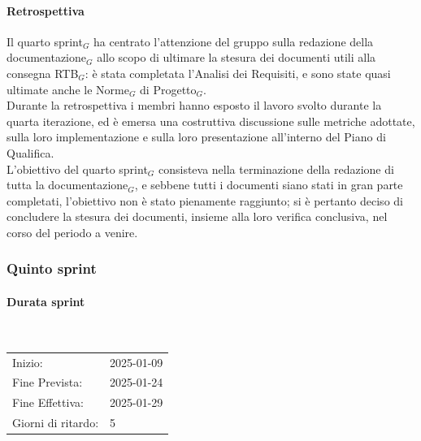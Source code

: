 \documentclass[10pt]{article}
\begin{document}
{{{{{    \paragraph{Retrospettiva}\mbox{}\vspace{0.4em}

    Il quarto sprint$_G$ ha centrato l'attenzione del gruppo sulla redazione della documentazione$_G$ allo scopo di ultimare la stesura dei 
    documenti utili alla consegna RTB$_G$: è stata completata l'Analisi dei Requisiti, e sono state quasi ultimate anche le Norme$_G$ di Progetto$_G$.\\
    Durante la retrospettiva i membri hanno esposto il lavoro svolto durante la quarta iterazione, ed è emersa una costruttiva discussione
    sulle metriche adottate, sulla loro implementazione e sulla loro presentazione all'interno del Piano di Qualifica.\\
    L'obiettivo del quarto sprint$_G$ consisteva nella terminazione della redazione di tutta la documentazione$_G$, e sebbene tutti i documenti siano
    stati in gran parte completati, l'obiettivo non è stato pienamente raggiunto; si è pertanto deciso di concludere la stesura dei documenti,
    insieme alla loro verifica conclusiva, nel corso del periodo a venire.



\newpage
\subsubsection{Quinto sprint}
\label{quinto-sprint$_G$}
    
    \paragraph{Durata sprint}\mbox{}\\
    \vspace{-1.5em}
    \begin{table}[h] 
    \renewcommand{\arraystretch}{1.2}  
    \begin{tabular}{ l l }
        Inizio: & 2025-01-09 \\
        Fine Prevista: & 2025-01-24 \\
        Fine Effettiva: & 2025-01-29 \\
        Giorni di ritardo: & 5 \\
    \end{tabular}
    \end{table}
    \vspace{-2em}
    {\renewcommand{\arraystretch}{1.5}%
    
}}}}}}
\end{document}
